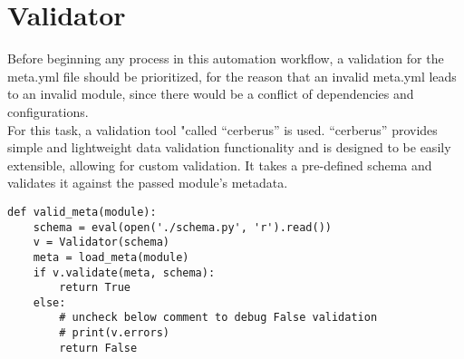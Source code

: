 \section{Validator}
Before beginning any process in this automation workflow, a validation for the meta.yml file should be prioritized, for the reason that an invalid meta.yml leads to an invalid module, since there would be a conflict of dependencies and configurations.\\

For this task, a validation tool "called “cerberus” is used. “cerberus” provides simple and lightweight data validation functionality and is designed to be easily extensible, allowing for custom validation\cite{cerberus}. It takes a pre-defined schema and validates it against the passed module’s metadata.

\begin{lstlisting}[caption=Metadata validation, style=pythonstyle]
def valid_meta(module):
    schema = eval(open('./schema.py', 'r').read())
    v = Validator(schema)
    meta = load_meta(module)
    if v.validate(meta, schema):
        return True
    else:
        # uncheck below comment to debug False validation
        # print(v.errors)
        return False
\end{lstlisting}


